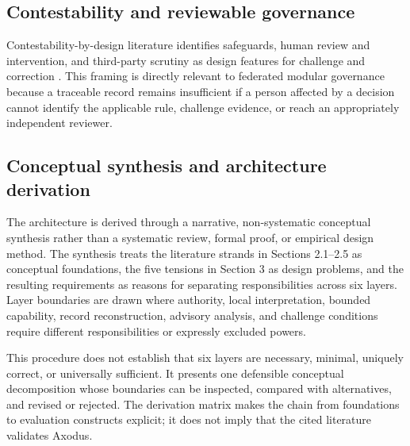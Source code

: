 \documentclass[11pt]{article}
\begin{document}
\begin{landscape}
\subsection{Contestability and reviewable governance}

Contestability-by-design literature identifies safeguards, human review and
intervention, and third-party scrutiny as design features for challenge and
correction \citep{alfrink2023contestable}. This framing is directly relevant
to federated modular governance because a traceable record remains
insufficient if a person affected by a decision cannot identify the
applicable rule, challenge evidence, or reach an appropriately independent
reviewer.

\subsection{Conceptual synthesis and architecture derivation}

The architecture is derived through a narrative, non-systematic conceptual
synthesis rather than a systematic review, formal proof, or empirical design
method. The synthesis treats the literature strands in Sections 2.1--2.5 as
conceptual foundations, the five tensions in Section 3 as design problems, and
the resulting requirements as reasons for separating responsibilities across
six layers. Layer boundaries are drawn where authority, local interpretation,
bounded capability, record reconstruction, advisory analysis, and challenge
conditions require different responsibilities or expressly excluded powers.

This procedure does not establish that six layers are necessary, minimal,
uniquely correct, or universally sufficient. It presents one defensible
conceptual decomposition whose boundaries can be inspected, compared with
alternatives, and revised or rejected. The derivation matrix makes the chain
from foundations to evaluation constructs explicit; it does not imply that
the cited literature validates Axodus.


\end{landscape}
\end{document}
